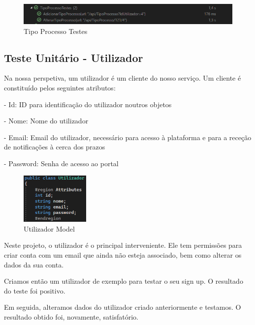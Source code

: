 \begin{figure}[!h]
\centering
\includegraphics[width=1\textwidth]{Figuras/Testes/TipoProcessoTestes.png}
\caption{Tipo Processo Testes}
\label{d.teste}
\end{figure}

\newpage


\subsection{Teste Unitário - Utilizador}
\indent \par Na nossa perspetiva, um utilizador é um cliente do nosso serviço. Um cliente é constituído pelos seguintes atributos:
\indent \par - Id: ID para identificação do utilizador noutros objetos
\indent \par - Nome: Nome do utilizador
\indent \par - Email: Email do utilizador, necessário para acesso à plataforma e para a receção de notificações à cerca dos prazos
\indent \par - Password: Senha de acesso ao portal

\begin{figure}[!h]
\centering
\includegraphics[width=0.3\textwidth]{Figuras/Models/UtilizadorModel.png}
\caption{Utilizador Model}
\label{d.model}
\end{figure}

\newpage

\indent \par Neste projeto, o utilizador é o principal interveniente. Ele tem permissões para criar conta com um email que ainda não esteja associado, bem como alterar os dados da sua conta.
\indent \par Criamos então um utilizador de exemplo para testar o seu sign up. O resultado do teste foi positivo.
\indent \par Em seguida, alteramos dados do utilizador criado anteriormente e testamos. O resultado obtido foi, novamente, satisfatório.

